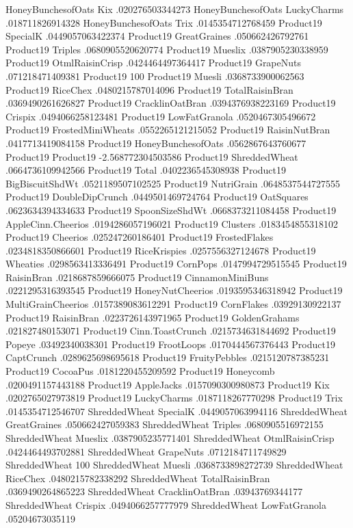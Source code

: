 HoneyBunchesofOats	Kix	.020276503344273
HoneyBunchesofOats	LuckyCharms	.018711826914328
HoneyBunchesofOats	Trix	.0145354712768459
Product19	SpecialK	.0449057063422374
Product19	GreatGraines	.050662426792761
Product19	Triples	.0680905520620774
Product19	Mueslix	.0387905230338959
Product19	OtmlRaisinCrisp	.0424464497364417
Product19	GrapeNuts	.071218471409381
Product19	100%
Product19	Muesli	.0368733900062563
Product19	RiceChex	.0480215787014096
Product19	TotalRaisinBran	.0369490261626827
Product19	CracklinOatBran	.0394376938223169
Product19	Crispix	.0494066258123481
Product19	LowFatGranola	.0520467305496672
Product19	FrostedMiniWheats	.0552265121215052
Product19	RaisinNutBran	.0417713419084158
Product19	HoneyBunchesofOats	.0562867643760677
Product19	Product19	-2.568772304503586
Product19	ShreddedWheat	.0664736109942566
Product19	Total	.0402236545308938
Product19	BigBiscuitShdWt	.0521189507102525
Product19	NutriGrain	.0648537544727555
Product19	DoubleDipCrunch	.0449501469724764
Product19	OatSquares	.0623634394334633
Product19	SpoonSizeShdWt	.0668373211084458
Product19	AppleCinn.Cheerios	.0194286057196021
Product19	Clusters	.0183454855318102
Product19	Cheerios	.025247260186401
Product19	FrostedFlakes	.0234818350866601
Product19	RiceKrispies	.0257556327124678
Product19	Wheaties	.0298563413336491
Product19	CornPops	.0147994729515545
Product19	RaisinBran	.0218687859666075
Product19	CinnamonMiniBuns	.0221295316393545
Product19	HoneyNutCheerios	.0193595346318942
Product19	MultiGrainCheerios	.0157389083612291
Product19	CornFlakes	.03929130922137
Product19	RaisinBran	.0223726143971965
Product19	GoldenGrahams	.021827480153071
Product19	Cinn.ToastCrunch	.0215734631844692
Product19	Popeye	.03492340038301
Product19	FrootLoops	.0170444567376443
Product19	CaptCrunch	.0289625698695618
Product19	FruityPebbles	.0215120787385231
Product19	CocoaPus	.0181220455209592
Product19	Honeycomb	.0200491157443188
Product19	AppleJacks	.0157090300980873
Product19	Kix	.0202765027973819
Product19	LuckyCharms	.0187118267770298
Product19	Trix	.0145354712546707
ShreddedWheat	SpecialK	.0449057063994116
ShreddedWheat	GreatGraines	.050662427059383
ShreddedWheat	Triples	.0680905516972155
ShreddedWheat	Mueslix	.0387905235771401
ShreddedWheat	OtmlRaisinCrisp	.0424464493702881
ShreddedWheat	GrapeNuts	.0712184711749829
ShreddedWheat	100%
ShreddedWheat	Muesli	.0368733898272739
ShreddedWheat	RiceChex	.0480215782338292
ShreddedWheat	TotalRaisinBran	.0369490264865223
ShreddedWheat	CracklinOatBran	.03943769344177
ShreddedWheat	Crispix	.0494066257777979
ShreddedWheat	LowFatGranola	.05204673035119

